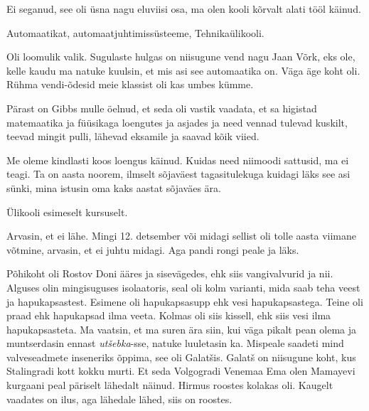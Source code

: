 
Ei seganud, see oli üsna nagu eluviisi osa,  ma olen kooli kõrvalt alati tööl 
käinud.
        
         
Automaatikat, automaatjuhtimissüsteeme, Tehnikaülikooli.


Oli loomulik valik. Sugulaste hulgas on niisugune vend nagu Jaan 
Võrk, eks ole, kelle kaudu ma natuke kuulsin, et mis asi 
see automaatika on. Väga äge koht oli. Rühma vendi-õdesid meie klassist 
oli kas umbes kümme. 
                 
Pärast on Gibbs mulle öelnud, et seda oli  
vastik vaadata, et sa higistad matemaatika ja füüsikaga loengutes ja asjades ja 
need vennad tulevad kuskilt, teevad  mingit pulli, lähevad eksamile ja saavad 
kõik viied. 


Me oleme kindlasti koos loengus käinud. Kuidas need niimoodi sattusid, ma ei 
teagi. Ta on aasta noorem, ilmselt  sõjaväest tagasitulekuga kuidagi läks see 
asi sünki, mina istusin oma kaks aastat sõjaväes ära.
                 

Ülikooli esimeselt kursuselt.

Arvasin, et ei lähe. Mingi 12. detsember või midagi sellist oli tolle aasta 
viimane võtmine, arvasin, et ei juhtu midagi. Aga pandi rongi peale ja läks.


Põhikoht oli Rostov Doni ääres ja sisevägedes, ehk siis vangivalvurid ja nii. 
Alguses olin  mingisuguses isolaatoris, seal oli kolm varianti, mida saab teha 
veest ja hapukapsastest. Esimene oli hapukapsasupp ehk vesi hapukapsastega. 
Teine oli praad ehk hapukapsad ilma veeta. Kolmas oli siis kissell, ehk siis 
vesi ilma hapukapsasteta. Ma vaatsin, et ma suren ära siin, kui väga pikalt 
pean olema  ja muntserdasin ennast \emph{utšebka}-sse, natuke luuletasin 
ka. Mispeale saadeti mind valveseadmete  inseneriks õppima, see oli 
Galatšis. Galatš  on niisugune koht, kus Stalingradi kott kokku murti. Et seda 
Volgogradi Venemaa Ema olen  Mamayevi kurgaani peal päriselt lähedalt näinud. 
Hirmus roostes kolakas oli. Kaugelt vaadates on ilus, aga lähedale lähed, siis 
on roostes.

